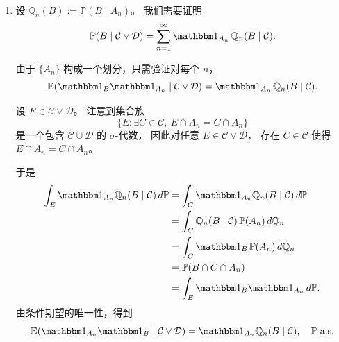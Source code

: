 \documentclass{ctexart}
\begin{document}
\begin{solution}
\begin{enumerate}
    \item
      设 $\mathbb Q_n(B):=\mathbb P(B\mid A_n)$。
      我们需要证明
      \[
        \mathbb P(B\mid\mathcal C\vee\mathcal D)
        =
        \sum_{n=1}^\infty \mathbbm 1_{A_n}\,
        \mathbb Q_n(B\mid\mathcal C).
      \]

      由于 $\{A_n\}$ 构成一个划分，只需验证对每个 $n$，
      \[
        \mathbb E(\mathbbm 1_B\mathbbm 1_{A_n}\mid\mathcal C\vee\mathcal D)
        =
        \mathbbm 1_{A_n}\,\mathbb Q_n(B\mid\mathcal C).
      \]

      设 $E\in\mathcal C\vee\mathcal D$。
      注意到集合族
      \[
        \bigl\{
          E:\exists C\in\mathcal C,\ E\cap A_n=C\cap A_n
        \bigr\}
      \]
      是一个包含 $\mathcal C\cup\mathcal D$ 的 $\sigma$-代数，
      因此对任意 $E\in\mathcal C\vee\mathcal D$，
      存在 $C\in\mathcal C$ 使得 $E\cap A_n=C\cap A_n$。

      于是
      \begin{align*}
        \int_E \mathbbm 1_{A_n}\mathbb Q_n(B\mid\mathcal C)\,d\mathbb P
        &=
        \int_C \mathbbm 1_{A_n}\mathbb Q_n(B\mid\mathcal C)\,d\mathbb P \\
        &=
        \int_C \mathbb Q_n(B\mid\mathcal C)\,\mathbb P(A_n)\,d\mathbb Q_n \\
        &=
        \int_C \mathbbm 1_B\,\mathbb P(A_n)\,d\mathbb Q_n \\
        &=
        \mathbb P(B\cap C\cap A_n) \\
        &=
        \int_E \mathbbm 1_B\mathbbm 1_{A_n}\,d\mathbb P.
      \end{align*}
      由条件期望的唯一性，得到
      \[
        \mathbb E(\mathbbm 1_{A_n}\mathbbm 1_B\mid\mathcal C\vee\mathcal D)
        =
        \mathbbm 1_{A_n}\mathbb Q_n(B\mid\mathcal C),
        \quad
        \mathbb P\text{-a.s.}
      \]
  \end{enumerate}
\end{solution}
\end{document}

